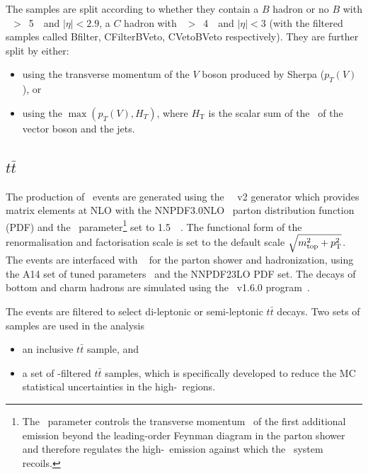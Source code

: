 \par The samples are split according to whether they contain a $B$ hadron or no $B$ with \pt~$>$~5~\GeV~and $|\eta| < 2.9$, 
a $C$ hadron with \pt~$>$~4~\GeV~and $|\eta| < 3$ (with the filtered samples called Bfilter, CFilterBVeto, CVetoBVeto respectively). 
They are further split by either:

\begin{itemize}
    \item using the transverse momentum of the $V$ boson produced by Sherpa ($p_T(V)$), or
    \item using the $\max(p_T(V), H_T)$, where $\ensuremath{H_{\mathrm{T}}}$ is the scalar sum of the \pt~of the vector boson and the jets.
\end{itemize}%

\subsection{$t\bar{t}$}

\par The production of \ttbar~events are generated using the \powhegbox~\cite{Frixione:2007nw,Nason:2004rx,Frixione:2007vw,Alioli:2010xd}~v2
generator which provides matrix elements at NLO with the NNPDF3.0NLO~\cite{Ball:2014uwa} parton distribution function (PDF) and the \hdamp\ parameter\footnote{The \hdamp\ parameter
controls the transverse momentum \pt\ of the first additional emission beyond the leading-order Feynman diagram
in the parton shower and therefore regulates the  high-\pt\ emission against which the \ttbar\ system recoils.} set to 1.5~\mtop~\cite{ATL-PHYS-PUB-2016-020}.
The functional form of the renormalisation and factorisation scale is set to the default scale $\sqrt{m_{\textrm{top}}^2 + p_{\textrm T}^2}$.
The events are interfaced with \pythia~\cite{Sjostrand:2014zea} for the parton shower and hadronization,
using the A14 set of tuned parameters~\cite{ATL-PHYS-PUB-2014-021}  and the NNPDF23LO PDF set.
The decays of bottom and charm hadrons are simulated using the \evtgen\ v1.6.0 program~\cite{EvtGen}.

\par The events are filtered to select di-leptonic or semi-leptonic $t\bar{t}$ decays. Two sets of samples are used in the analysis

\begin{itemize}
    \item an inclusive $t\bar{t}$ sample, and
    \item a set of \met-filtered $t\bar{t}$ samples, which is specifically developed to reduce the MC statistical uncertainties in the high-\met~regions.
\end{itemize}

